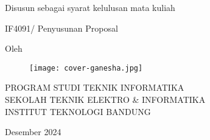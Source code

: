 \clearpage
\pagestyle{empty}

\begin{center}
    \smallskip

    \Large \bfseries \MakeUppercase{\thetitle}
    \vfill


    \large Disusun sebagai syarat kelulusan mata kuliah

    \large IF4091/ Penyusunan Proposal
    \vfill

    \large Oleh

    \Large \theauthor

    \vfill
    \begin{figure}[htbp]
        \centering
        \texttt{[image: cover-ganesha.jpg]}
    \end{figure}
    \vfill

    \large
    \uppercase{
        Program Studi Teknik Informatika \\
        Sekolah Teknik Elektro \& Informatika \\
        Institut Teknologi Bandung
    }

    Desember 2024

\end{center}

\clearpage
